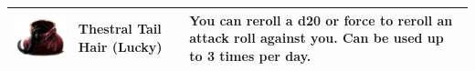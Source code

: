 \begin{tabular}{ m{4cm}m{3cm}m{6cm} }
	\includegraphics[width=4cm]{../Pictures/Gameplay/Items/Wearables/Wand/Cores/Thestral_tail_hair_icon.png} & \textbf{Thestral Tail Hair (Lucky)} & You can reroll a d20 or force to reroll an attack roll against you. Can be used up to 3 times per day. \\ \hline
\end{tabular}

\clearpage